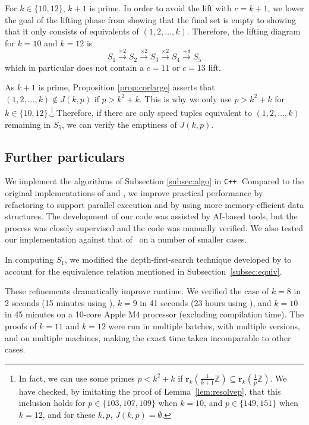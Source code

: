 \documentclass[11pt]{amsart}
\newcommand{\Z}{\mathbb{Z}}
\newcommand{\rbf}{\mathbf{r}}
\newcommand{\onetok}{(1, 2, \dots, k)}
\theoremstyle{definition}
\theoremstyle{remark}
\begin{document}
For $k\in\{10,12\}$, $k+1$ is prime. 
In order to avoid the lift with $c=k+1$, we lower the goal of the lifting phase from showing that the final set is empty 
to showing that it only consists of equivalents of $\onetok$.
Therefore, the lifting diagram for $k = 10$ and $k=12$ is 
\[ S_1\xrightarrow{\times 2}S_2\xrightarrow{\times 2}S_3\xrightarrow{\times 2}S_4\xrightarrow{\div 8}S_5 \] 
which in particular does not contain a $c=11$ or $c=13$ lift.

As $k+1$ is prime, Proposition \ref{prop:corlarge} asserts that $\onetok\notin J(k,p)$ if $p>k^2+k$.
This is why we only use $p>k^2+k$ for $k\in\{10,12\}$.\footnote{
  In fact, we can use some primes $p<k^2+k$ if $\rbf_k(\frac{1}{k+1}\Z)\subseteq\rbf_k(\frac{1}{p}\Z)$.
  We have checked, by imitating the proof of Lemma~\ref{lem:resolvep}, 
  that this inclusion holds for $p \in \{103, 107, 109\}$ when $k=10$, and $p \in \{149,151\}$ when $k=12$,
  and for these $k,p$, $J(k,p)=\emptyset$.
} Therefore, if there are only speed tuples equivalent to $\onetok$ remaining in $S_5$, we can verify the emptiness of $J(k,p)$.

\subsection{Further particulars}
\label{subsec:particulars}
We implement the algorithms of Subsection \ref{subsec:algo} in \texttt{C++}.
Compared to the original implementations of \cite{rosenfeldcode} and \cite{tanupatcode},
we improve practical performance by refactoring to support parallel execution and by using more memory-efficient data structures. The
development of our code was assisted by AI-based tools, but the process was closely supervised
and the code was manually verified. 
We also tested our implementation against that of~\cite{tanupatcode} on a number of smaller cases.

In computing $S_1$, we modified the depth-first-search technique developed by \cite{rosenfeldcode} to account for the equivalence relation
mentioned in Subsection~\ref{subsec:equiv}.

These refinements dramatically improve runtime. We verified the case of $k=8$ in 2 seconds (15 minutes using \cite{tanupatcode}), 
$k=9$ in 41 seconds (23 hours using \cite{tanupatcode}), and $k=10$ in 45 minutes on a 10-core Apple M4 processor
(excluding compilation time). 
The proofs of $k=11$ and $k=12$ were run in multiple batches, with multiple versions, 
and on multiple machines, making the exact time taken incomparable to other cases. 
\end{document}
